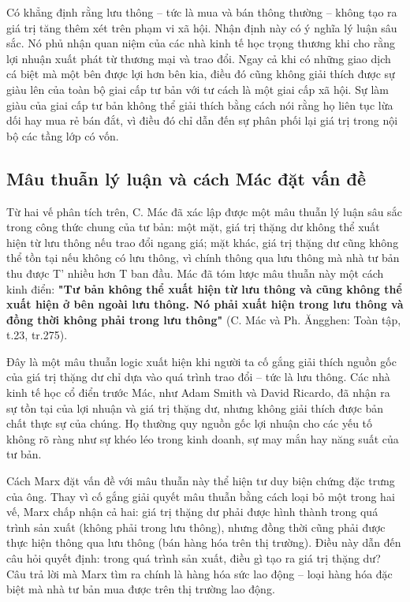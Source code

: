 Có khẳng định rằng lưu thông – tức là mua và bán thông thường – không tạo ra giá trị tăng thêm xét trên phạm vi xã hội. Nhận định này có ý nghĩa lý luận sâu sắc. Nó phủ nhận quan niệm của các nhà kinh tế học trọng thương khi cho rằng lợi nhuận xuất phát từ thương mại và trao đổi. Ngay cả khi có những giao dịch cá biệt mà một bên được lợi hơn bên kia, điều đó cũng không giải thích được sự giàu lên của toàn bộ giai cấp tư bản với tư cách là một giai cấp xã hội. Sự làm giàu của giai cấp tư bản không thể giải thích bằng cách nói rằng họ liên tục lừa dối hay mua rẻ bán đắt, vì điều đó chỉ dẫn đến sự phân phối lại giá trị trong nội bộ các tầng lớp có vốn.
\subsection{Mâu thuẫn lý luận và cách Mác đặt vấn đề}
Từ hai vế phân tích trên, C. Mác đã xác lập được một mâu thuẫn lý luận sâu sắc trong công thức chung của tư bản: một mặt, giá trị thặng dư không thể xuất hiện từ lưu thông nếu trao đổi ngang giá; mặt khác, giá trị thặng dư cũng không thể tồn tại nếu không có lưu thông, vì chính thông qua lưu thông mà nhà tư bản thu được T' nhiều hơn T ban đầu. Mác đã tóm lược mâu thuẫn này một cách kinh điển: \textbf{"Tư bản không thể xuất hiện từ lưu thông và cũng không thể xuất hiện ở bên ngoài lưu thông. Nó phải xuất hiện trong lưu thông và đồng thời không phải trong lưu thông"} (C. Mác và Ph. Ăngghen: Toàn tập, t.23, tr.275).

Đây là một mâu thuẫn logic xuất hiện khi người ta cố gắng giải thích nguồn gốc của giá trị thặng dư chỉ dựa vào quá trình trao đổi – tức là lưu thông. Các nhà kinh tế học cổ điển trước Mác, như Adam Smith và David Ricardo, đã nhận ra sự tồn tại của lợi nhuận và giá trị thặng dư, nhưng không giải thích được bản chất thực sự của chúng. Họ thường quy nguồn gốc lợi nhuận cho các yếu tố không rõ ràng như sự khéo léo trong kinh doanh, sự may mắn hay năng suất của tư bản.

Cách Marx đặt vấn đề với mâu thuẫn này thể hiện tư duy biện chứng đặc trưng của ông. Thay vì cố gắng giải quyết mâu thuẫn bằng cách loại bỏ một trong hai vế, Marx chấp nhận cả hai: giá trị thặng dư phải được hình thành trong quá trình sản xuất (không phải trong lưu thông), nhưng đồng thời cũng phải được thực hiện thông qua lưu thông (bán hàng hóa trên thị trường). Điều này dẫn đến câu hỏi quyết định: trong quá trình sản xuất, điều gì tạo ra giá trị thặng dư? Câu trả lời mà Marx tìm ra chính là hàng hóa sức lao động – loại hàng hóa đặc biệt mà nhà tư bản mua được trên thị trường lao động.

